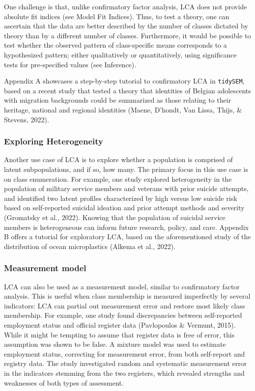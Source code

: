 \documentclass[
  ,man,floatsintext]{apa6}
\begin{document}
One challenge is that, unlike confirmatory factor analysis, LCA does not provide absolute fit indices (see Model Fit Indices).
Thus, to test a theory, one can ascertain that the data are better described by the number of classes dictated by theory than by a different number of classes.
Furthermore, it would be possible to test whether the observed pattern of class-specific means corresponds to a hypothesized pattern;
either qualitatively or quantitatively, using significance tests for pre-specified values (see Inference).

Appendix A showcases a step-by-step tutorial to confirmatory LCA in \texttt{tidySEM},
based on a recent study that tested a theory that identities of Belgian adolescents with migration backgrounds could be summarized as those relating to their heritage, national and regional identities (Maene, D'hondt, Van Lissa, Thijs, \& Stevens, 2022).

\hypertarget{exploring-heterogeneity}{%
\subsubsection{Exploring Heterogeneity}\label{exploring-heterogeneity}}

Another use case of LCA is to explore whether a population is comprised of latent subpopulations, and if so, how many.
The primary focus in this use case is on class enumeration.
For example,
one study explored heterogeneity in the population of military service members and veterans with prior suicide attempts,
and identified two latent profiles characterized by high versus low suicide risk based on self-reported suicidal ideation and prior attempt methods and severity
(Gromatsky et al., 2022).
Knowing that the population of suicidal service members is heterogeneous can inform future research, policy, and care.
Appendix B offers a tutorial for exploratory LCA,
based on the aforementioned study of the distribution of ocean microplastics (Alkema et al., 2022).

\hypertarget{measurement-model}{%
\subsubsection{Measurement model}\label{measurement-model}}

LCA can also be used as a measurement model, similar to confirmatory factor analysis.
This is useful when class membership is measured imperfectly by several indicators:
LCA can partial out measurement error and restore most likely class membership.
For example, one study found discrepancies between self-reported employment status and official register data (Pavlopoulos \& Vermunt, 2015).
While it might be tempting to assume that register data is free of error, this assumption was shown to be false.
A mixture model was used to estimate employment status, correcting for measurement error, from both self-report and registry data.
The study investigated random and systematic measurement error in the indicators stemming from the two registers,
which revealed strengths and weaknesses of both types of assessment.
\end{document}
